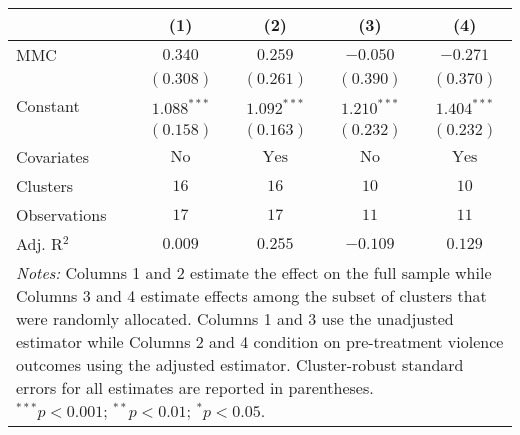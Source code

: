 
\begin{tabular}{l c c c c}
\toprule
 & (1) & (2) & (3) & (4) \\
\midrule
MMC          & $0.340$       & $0.259$        & $-0.050$      & $-0.271$       \\
             & $(0.308)$     & $(0.261)$      & $(0.390)$     & $(0.370)$      \\
Constant     & $1.088^{***}$ & $1.092^{***}$  & $1.210^{***}$ & $1.404^{***}$  \\
             & $(0.158)$     & $(0.163)$      & $(0.232)$     & $(0.232)$      \\
\midrule
Covariates   & $\textrm{No}$ & $\textrm{Yes}$ & $\textrm{No}$ & $\textrm{Yes}$ \\
Clusters     & $16$          & $16$           & $10$          & $10$           \\
Observations & $17$          & $17$           & $11$          & $11$           \\
Adj. R$^2$   & $0.009$       & $0.255$        & $-0.109$      & $0.129$        \\
\bottomrule
\multicolumn{5}{l}{\scriptsize{\parbox{.5\linewidth}{\vspace{2pt} 
       \textit{Notes:} Columns 1 and 2 estimate the effect on the full sample while Columns 3 
       and 4 estimate effects among the subset of clusters that were randomly allocated.
       Columns 1 and 3 use the unadjusted estimator while Columns 2 and 4 condition on 
       pre-treatment violence outcomes using the adjusted estimator. Cluster-robust 
       standard errors for all estimates are reported in parentheses. \\ $^{***}p<0.001$; $^{**}p<0.01$; $^{*}p<0.05$.}}}
\end{tabular}
